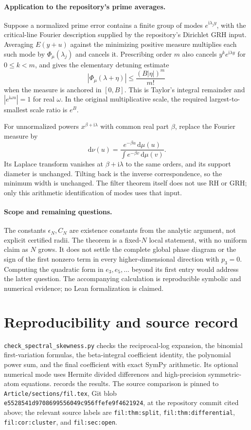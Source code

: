 \documentclass[11pt,a4paper]{article}
\theoremstyle{remark}\newtheorem{remark}[theorem]{Remark}
\newcommand{\dd}{\,\mathrm d}\newcommand{\ii}{\mathrm i}
\begin{document}
\paragraph{Application to the repository's prime averages.}
Suppose a normalized prime error contains a finite group of modes
$e^{\ii\lambda_j y}$, with the critical-line Fourier description supplied by the repository's Dirichlet GRH input. Averaging $E(y+u)$ against the minimizing positive measure multiplies each such mode by $\Phi_\mu(\lambda_j)$ and cancels it. Prescribing order $m$ also cancels
$y^k e^{\ii\lambda y}$ for $0\le k<m$, and gives the elementary detuning estimate
\[
 |\Phi_\mu(\lambda+\eta)|\le\frac{(B|\eta|)^m}{m!}
\]
when the measure is anchored in $[0,B]$. This is Taylor's integral remainder and $|e^{\ii\omega u}|=1$ for real $\omega$.
In the original multiplicative scale, the required largest-to-smallest scale ratio is $e^B$.

For unnormalized powers $x^{\beta+\ii\lambda}$ with common real part $\beta$, replace the Fourier measure by
\[
 \dd\nu(u)=\frac{e^{-\beta u}\dd\mu(u)}{\int e^{-\beta v}\dd\mu(v)}.
\]
Its Laplace transform vanishes at $\beta+\ii\lambda$ to the same orders, and its support diameter is unchanged. Tilting back is the inverse correspondence, so the minimum width is unchanged. The filter theorem itself does not use RH or GRH; only this arithmetic identification of modes uses that input.

\paragraph{Scope and remaining questions.}
The constants $\epsilon_N,C_N$ are existence constants from the analytic argument, not explicit certified radii. The theorem is a fixed-$N$ local statement, with no uniform claim as $N$ grows. It does not settle the complete global phase diagram or the sign of the first nonzero term in every higher-dimensional direction with $p_3=0$. Computing the quadratic form in $e_3,e_5,\ldots$ beyond its first entry would address the latter question. The accompanying calculation is reproducible symbolic and numerical evidence; no Lean formalization is claimed.

\section*{Reproducibility and source record}
\texttt{check\_spectral\_skewness.py} checks the reciprocal-log expansion, the binomial first-variation formulas, the beta-integral coefficient identity, the polynomial power sum, and the final coefficient with exact SymPy arithmetic. Its optional numerical mode uses Hermite divided differences and high-precision symmetric-atom equations.  records the results. The source comparison is pinned to \texttt{Article/sections/fil.tex}, Git blob
\texttt{e5528541d9708699556049c956ffefe9f4621924}, at the repository commit cited above; the relevant source labels are \texttt{fil:thm:split}, \texttt{fil:thm:differential}, \texttt{fil:cor:cluster}, and \texttt{fil:sec:open}.
\end{document}
